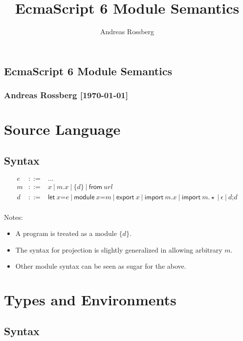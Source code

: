 \documentclass[10pt,a4paper]{article}
\title{EcmaScript 6 Module Semantics}
\author{Andreas Rossberg}
\newcommand\x[1]{\ensuremath{\mathit{#1}}\xspace}
\newcommand\K[1]{\ensuremath{\textsf{#1}}}
\newcommand\note[1]{\noindent #1}
\begin{document}

\begin{center}
\section*{\textsf{EcmaScript 6 Module Semantics}}
\subsubsection*{Andreas Rossberg [\today]}
\end{center}


\section{Source Language}

\subsection*{Syntax}

$$
\begin{array}{rcl}
e &::=& \dots \\ %
m &::=& x ~|~ m\K.x ~|~ \{d\} ~|~ \K{from}~\x{url} \\
d &::=& \K{let}~x\K=e ~|~ \K{module}~x\K=m ~|~ \K{export}~x ~|~ \K{import}~m\K.x ~|~ \K{import}~m\K.{\star}
  ~|~ \epsilon ~|~ d\K;d \\
\end{array}
$$

\note{
Notes:
\begin{itemize}
\item A program is treated as a module $\{d\}$.
\item The syntax for projection is slightly generalized in allowing arbitrary $m$.
\item Other module syntax can be seen as sugar for the above.
\end{itemize}
}


\section{Types and Environments}

\subsection*{Syntax}
\end{document}
